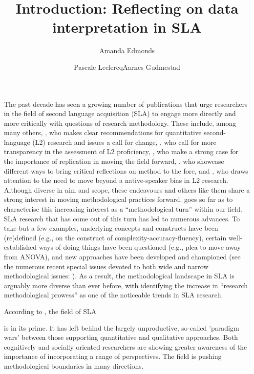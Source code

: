 \documentclass[output=paper]{../langscibook}
\author{Amanda Edmonds\affiliation{Université Paul-Valéry Montpellier 3}\orcid{}\and Pascale Leclercq\affiliation{Université Paul-Valéry Montpellier 3}\orcid{}\lastand Aarnes Gudmestad\affiliation{Virginia Polytechnic Institute and State University}\orcid{}}
\title{Introduction: Reflecting on data interpretation in SLA}
\begin{document}
\maketitle 


\noindent The past decade has seen a growing number of publications that urge researchers in the field of second language acquisition (SLA) to engage more directly and more critically with questions of research methodology. These include, among many others, \citet{Plonsky2014}, who makes clear recommendations for quantitative second-language (L2) research and issues a call for change, \citet{LeclercqEtAl2014}, who call for more transparency in the assessment of L2 proficiency, \citet{MarsdenEtAl2016}, who make a strong case for the importance of replication in moving the field forward, \citet{GudmestadEdmonds2018}, who showcase different ways to bring critical reflections on method to the fore, and \citet{Ortega2014ways}, who draws attention to the need to move beyond a native-speaker bias in L2 research. Although diverse in aim and scope, these endeavours and others like them share a strong interest in moving methodological practices forward. \citet[825]{Byrnes2013} goes so far as to characterise this increasing interest as a “methodological turn” within our field. SLA research that has come out of this turn has led to numerous advances. To take but a few examples, underlying concepts and constructs have been (re)defined (e.g., \citealt{Pallotti2009} on the construct of complexity-accuracy-fluency), certain well-established ways of doing things have been questioned (e.g.,  plea to move away from ANOVA), and new approaches have been developed and championed (see the numerous recent special issues devoted to both wide and narrow methodological issues: \citealt{NorrisEtAl2015,ChoiRichards2016,DeCostaEtAl2017, EdmondsEtAlinpress}). As a result, the methodological landscape in SLA is arguably more diverse than ever before, with \citet[5]{Ortega2013} identifying the increase in “research methodological prowess” as one of the noticeable trends in SLA research.

According to  \citet[214]{KingMackey2016}, the field of SLA

is in its prime. It has left behind the largely unproductive, so-called 'paradigm wars' between those supporting quantitative and qualitative approaches. Both cognitively and socially oriented researchers are showing greater awareness of the importance of incorporating a range of perspectives. The field is pushing methodological boundaries in many directions.
\end{document}
